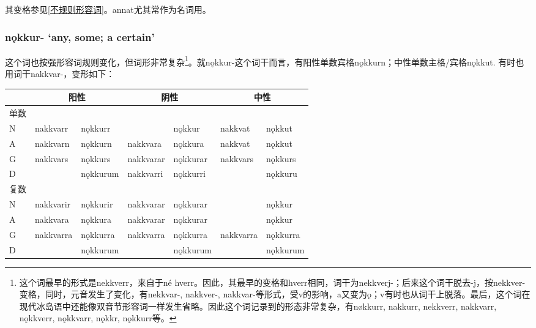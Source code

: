\begin{introduction}[章节要点]
其变格参见\ref{不规则形容词}。annat尤其常作为名词用。

\subsubsection{nǫkkur- `any, some; a certain‌'}

这个词也按强形容词规则变化，但词形非常复杂\footnote{这个词最早的形式是nekkverr，来自于né hverr。因此，其最早的变格和hverr相同，词干为nekkverj-；后来这个词干脱去-j，按nekkver-变格，同时，元音发生了变化，有nekkvar-, nakkver-, nakkvar-等形式，受v的影响，a又变为ǫ；v有时也从词干上脱落。最后，这个词在现代冰岛语中还能像双音节形容词一样发生省略。因此这个词记录到的形态非常复杂，有nøkkurr, nakkurr, nekkverr, nakkvarr, nǫkkverr, nǫkkvarr, nǫkkr, nǫkkurr等。}。就nǫkkur-这个词干而言，有阳性单数宾格nǫkkurn；中性单数主格/宾格nǫkkut.
有时也用词干nakkvar-，变形如下：

\begin{longtable}{lllllll}
    \toprule
         & \multicolumn{2}{c}{阳性} & \multicolumn{2}{c}{阴性} & \multicolumn{2}{c}{中性}                                   \\
    \midrule
    \endhead
    \bottomrule
    \endfoot
    单数 &                          &                          &                          &          &           &          \\
    N    & nakkvarr                 & nǫkkurr                  &                          & nǫkkur   & nakkvat   & nǫkkut   \\
    A    & nakkvarn                 & nǫkkurn                  & nakkvara                 & nǫkkura  & nakkvat   & nǫkkut   \\
    G    & nakkvars                 & nǫkkurs                  & nakkvarar                & nǫkkurar & nakkvars  & nǫkkurs  \\
    D    &                          & nǫkkurum                 & nakkvarri                & nǫkkurri &           & nǫkkuru  \\
    复数 &                          &                          &                          &          &           &          \\
    N    & nakkvarir                & nǫkkurir                 & nakkvarar                & nǫkkurar &           & nǫkkur   \\
    A    & nakkvara                 & nǫkkura                  & nakkvarar                & nǫkkurar &           & nǫkkur   \\
    G    & nakkvarra                & nǫkkurra                 & nakkvarra                & nǫkkurra & nakkvarra &
    nǫkkurra                                                                                                                \\
    D    &                          & nǫkkurum                 &                          & nǫkkurum &           & nǫkkurum \\
\end{longtable}


\end{introduction}
